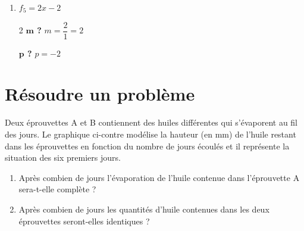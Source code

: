 \documentclass[a4paper, 12pt, parskip=half-]{scrartcl}
\begin{document}
\begin{solution}
\begin{enumerate}
\begin{multicols}{2}
                  \textbf{$\bm{p}$ ?}
                  \medbreak
                  $f_4$ est linéaire $\Rightarrow p=0$
              \end{multicols}
        \item $f_5 = 2x-2 $
              \begin{multicols}{2}
                  \textbf{$\bm{m}$ ?}
                  \medbreak
                  $m=\dfrac{2}{1} = 2$
                  \columnbreak

                  \textbf{$\bm{p}$ ?}
                  \medbreak
                  $p=-2$
              \end{multicols}
    \end{enumerate}
    \newpage
\end{solution}
\section*{ Résoudre un problème}
\begin{exercise}[points=4]
    \parbox[c]{.5\linewidth}{Deux éprouvettes A et B contiennent des huiles différentes qui s'évaporent au fil des jours.
    Le graphique ci-contre modélise la hauteur (en mm) de l'huile restant dans les éprouvettes en fonction du nombre de jours écoulés et il représente la situation des six premiers jours.}
    \hfil
    
    \begin{enumerate}
        \item Après combien de jours l'évaporation de l'huile contenue dans l'éprouvette A sera-t-elle complète ?
        \item Après combien de jours les quantités d'huile contenues dans les deux éprouvettes seront-elles identiques ?
    \end{enumerate}
\end{exercise}
\end{document}

